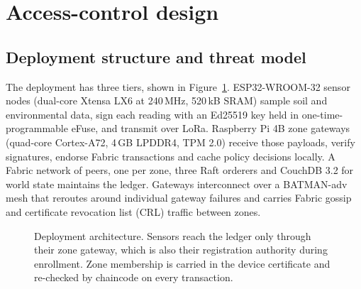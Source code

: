 \section{Access-control design}
\label{sec:design}

\subsection{Deployment structure and threat model}

The deployment has three tiers, shown in Figure~\ref{fig:architecture}. ESP32-WROOM-32 sensor nodes (dual-core Xtensa LX6 at 240\,MHz, 520\,kB SRAM) sample soil and environmental data, sign each reading with an Ed25519 key held in one-time-programmable eFuse, and transmit over LoRa. Raspberry Pi 4B zone gateways (quad-core Cortex-A72, 4\,GB LPDDR4, TPM 2.0) receive those payloads, verify signatures, endorse Fabric transactions and cache policy decisions locally. A Fabric network of \Gateways{} peers, one per zone, three Raft orderers and CouchDB 3.2 for world state maintains the ledger. Gateways interconnect over a BATMAN-adv mesh \citep{neumann2008batman} that reroutes around individual gateway failures and carries Fabric gossip and certificate revocation list (CRL) traffic between zones.

\begin{figure}[H]
\centering
{}
\caption{Deployment architecture. Sensors reach the ledger only through their zone gateway, which is also their registration authority during enrollment. Zone membership is carried in the device certificate and re-checked by chaincode on every transaction.}
\label{fig:architecture}
\end{figure}

